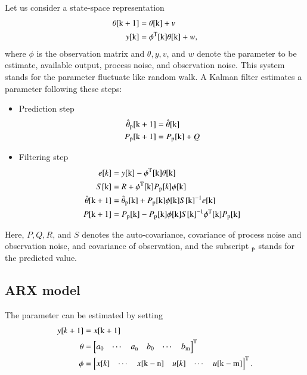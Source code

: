 \documentclass[10pt]{article}
\begin{document}
Let us consider a state-space representation
\begin{align}
\theta[{\rm k}+1] &= \theta[{\rm k}] + v\\
y[{\rm k}] &= \phi^{\mathrm T}[{\rm k}]\theta[{\rm k}] + w,
\end{align}
where $\phi$ is the observation matrix and $\theta, y, v$, and $w$ denote the parameter to be estimate, available output, process noise, and observation noise.
This system stands for the parameter fluctuate like random walk.
A Kalman filter estimates a parameter following these steps:
\begin{itemize}
\item Prediction step
\begin{align}
\hat{\theta}_{\rm p}[{\rm k}+1] &= \hat{\theta}[{\rm k}]\\
P_{\rm p}[{\rm k} + 1] &= P_{\rm p}[{\rm k}] + Q
\end{align}
\end{itemize}
\begin{itemize}
\item Filtering step
\begin{align}
e[{\rm }k] &= y[{\rm k}] - \phi^{\mathrm T}[{\rm k}]\theta[{\rm k}]\\
S[{\rm k}]&= R + \phi^{\mathrm T}[{\rm k}]P_{\rm p}[k]\phi[{\rm k}]\\
\hat{\theta}[{\rm k}+1] &= \hat{\theta}_{\rm p}[{\rm k}] + P_{\rm p}[{\rm 
k}]\phi[{\rm k}]S[{\rm k}]^{-1}e[{\rm k}]\\
P[{\rm k} + 1] &= P_{\rm p}[{\rm k}] - P_{\rm p}[{\rm 
k}]\phi[{\rm k}]S[{\rm k}]^{-1}\phi^{\mathrm T}[{\rm k}]P_{\rm p}[{\rm 
k}]
\end{align}
\end{itemize}
Here, $P, Q, R$, and $S$ denotes the auto-covariance, covariance of process noise and observation noise, and covariance of observation, and the subscript $_{\rm p}$ stands for the predicted value.



\subsection{ARX model} 
The parameter can be estimated by setting
\begin{align}
y[k+1] &= x[{\rm k}+1]\\
\theta&=\begin{bmatrix}a_0 & \cdots & a_{\rm n} & b_{0} & \cdots & b_{\rm m}\end{bmatrix}^{\rm T}\\
\phi&=\begin{bmatrix}x[k] & \cdots & x[{\rm k-n}] & u[k] & \cdots & u[{\rm k-m}]\end{bmatrix}^{\rm T}.
\end{align}
\end{document}
